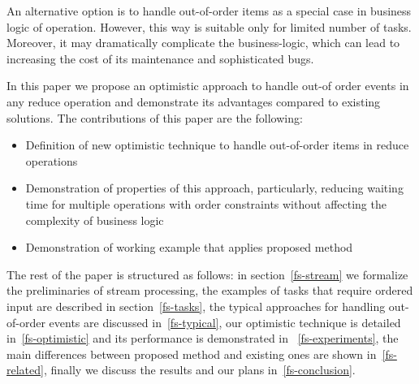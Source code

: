 An alternative option is to handle out-of-order items as a special case in business logic of operation. However, this way is suitable only for limited number of tasks. Moreover, it may dramatically complicate the business-logic, which can lead to increasing the cost of its maintenance and sophisticated bugs.    

In this paper we propose an optimistic approach to handle out-of order events in any reduce operation and demonstrate its advantages compared to existing solutions. The contributions of this paper are the following: 
\begin {itemize}
\item Definition of new optimistic technique to handle out-of-order items in reduce operations
\item Demonstration of properties of this approach, particularly, reducing waiting time for multiple operations with order constraints without affecting the complexity of business logic
\item Demonstration of working example that applies proposed method
\end {itemize}

The rest of the paper is structured as follows: in section~\ref{fs-stream} we formalize the preliminaries of stream processing, the examples of tasks that require ordered input are described in section~\ref{fs-tasks}, the typical approaches for handling out-of-order events are discussed in~\ref{fs-typical}, our optimistic technique is detailed in~\ref{fs-optimistic} and its performance is demonstrated in ~\ref{fs-experiments}, the main differences between proposed method and existing ones are shown in~\ref{fs-related}, finally we discuss the results and our plans in~\ref{fs-conclusion}.
